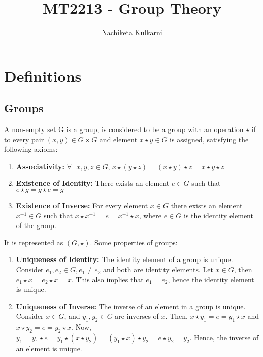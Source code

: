 \documentclass[12pt, oneside]{book}
\date{}
\title{MT2213 - Group Theory}
\author{Nachiketa Kulkarni}
\begin{document}
\maketitle
\tableofcontents

\mainmatter
\chapter{Definitions}
\section{Groups}
A non-empty set G is a group, is considered to be a group with an operation \(\star\) if to every pair \( \left(x,y\right) \in G \times G\) and element \(x \star y \in G\) is assigned, satisfying the following axioms:
\begin{enumerate}
    \item \textbf{Associativity:} \(\forall\text{ } x,y,z \in G\), \(x \star \left(y \star z\right) = \left(x \star y \right) \star z = x \star y \star z \)
    \item \textbf{Existence of Identity:} There exists an element \(e \in G\) such that \(e \star g = g \star e = g\)
    \item \textbf{Existence of Inverse:} For every element \(x \in G\) there exists an element \(x^{-1} \in G\) such that \(x \star x^{-1} = e = x^{-1} \star x \), where \(e \in G\) is the identity element of the group.
\end{enumerate}
It is represented as \( \left(G, \star \right) \).
Some properties of groups:
\begin{enumerate}
    \item \textbf{Uniqueness of Identity:} The identity element of a group is unique.
    Consider \(e_1, e_2 \in G, e_1 \neq e_2\) and both are identity elements.
    Let \(x \in G\), then \( e_1 \star x = e_2 \star x = x \).
    This also implies that \(e_1 = e_2\), hence the identity element is unique.
    \item \textbf{Uniqueness of Inverse:} The inverse of an element in a group is unique.
    Consider \(x \in G\), and \(y_1, y_2 \in G\) are inverses of \(x\).
    Then, \(x \star y_1 = e = y_1 \star x\) and \(x \star y_2 = e = y_2 \star x\).
    Now, \(y_1 = y_1 \star e = y_1 \star \left(x \star y_2\right) = \left(y_1 \star x\right) \star y_2 = e \star y_2 = y_2\).
    Hence, the inverse of an element is unique.
\end{enumerate}
\end{document}

